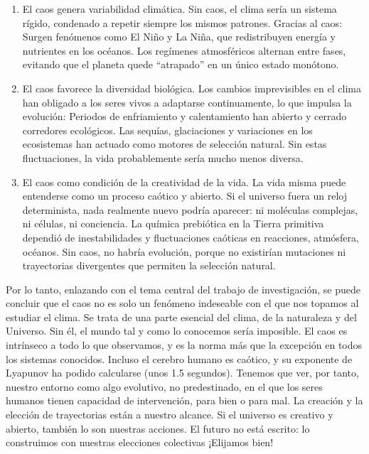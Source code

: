 \documentclass[
  10pt,
  a4paper,
  DIV=11,
  numbers=noendperiod,
  open=any]{scrreprt}
\numberwithin{equation}{chapter}
\numberwithin{equation}{section}
\renewcommand{\[}{\begin{equation}}
\renewcommand{\]}{\end{equation}}
\begin{document}
\begin{enumerate}
\def\labelenumi{\arabic{enumi}.}
\item
  El caos genera variabilidad climática. Sin caos, el clima sería un
  sistema rígido, condenado a repetir siempre los mismos patrones.
  Gracias al caos: Surgen fenómenos como El Niño y La Niña, que
  redistribuyen energía y nutrientes en los océanos. Los regímenes
  atmosféricos alternan entre fases, evitando que el planeta quede
  ``atrapado'' en un único estado monótono.
\item
  El caos favorece la diversidad biológica. Los cambios imprevisibles en
  el clima han obligado a los seres vivos a adaptarse continuamente, lo
  que impulsa la evolución: Periodos de enfriamiento y calentamiento han
  abierto y cerrado corredores ecológicos. Las sequías, glaciaciones y
  variaciones en los ecosistemas han actuado como motores de selección
  natural. Sin estas fluctuaciones, la vida probablemente sería mucho
  menos diversa.
\item
  El caos como condición de la creatividad de la vida. La vida misma
  puede entenderse como un proceso caótico y abierto. Si el universo
  fuera un reloj determinista, nada realmente nuevo podría aparecer: ni
  moléculas complejas, ni células, ni conciencia. La química prebiótica
  en la Tierra primitiva dependió de inestabilidades y fluctuaciones
  caóticas en reacciones, atmósfera, océanos. Sin caos, no habría
  evolución, porque no existirían mutaciones ni trayectorias divergentes
  que permiten la selección natural.
\end{enumerate}

Por lo tanto, enlazando con el tema central del trabajo de
investigación, se puede concluir que el caos no es solo un fenómeno
indeseable con el que nos topamos al estudiar el clima. Se trata de una
parte esencial del clima, de la naturaleza y del Universo. Sin él, el
mundo tal y como lo conocemos sería imposible. El caos es intrínseco a
todo lo que observamos, y es la norma más que la excepción en todos los
sistemas conocidos. Incluso el cerebro humano es caótico, y su exponente
de Lyapunov ha podido calcularse (unos 1.5 segundos). Tenemos que ver,
por tanto, nuestro entorno como algo evolutivo, no predestinado, en el
que los seres humanos tienen capacidad de intervención, para bien o para
mal. La creación y la elección de trayectorias están a nuestro alcance.
Si el universo es creativo y abierto, también lo son nuestras acciones.
El futuro no está escrito: lo construimos con nuestras elecciones
colectivas ¡Elijamos bien!
\end{document}
